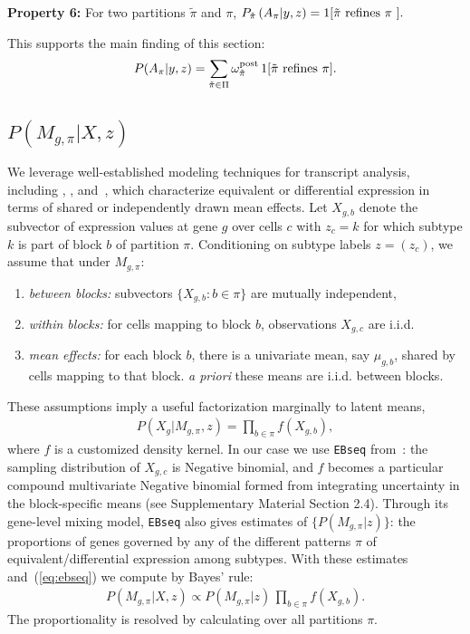 \documentclass[aoas,preprint]{imsart}
\begin{document}
\noindent
{\bf Property 6:} For two partitions $\tilde \pi$ and $\pi$,  
$P_{\tilde \pi}\left( A_{\pi} | y,z \right) = 1[ {\mbox {\rm $\tilde \pi$ refines $\pi$ }}].$

This supports the main finding of this section:
\begin{eqnarray}
\label{eq:mainfinding}
P(A_\pi|y,z) = 
\sum_{\tilde \pi \in \Pi} \omega^{\rm post}_{\tilde \pi} \,  1[ {\mbox {\rm $\tilde \pi$ refines $\pi$}} ].
\end{eqnarray}


\subsection{$P(M_{g,\pi}|X,z)$}
We leverage well-established modeling techniques for transcript analysis, including
\citep{ref:Leng}, \citep{Kendziorski:2003aa}, and~\citep{Jensen:2009aa}, which characterize
 equivalent or differential expression in terms of shared or independently drawn mean effects.  Let
$X_{g,b}$ denote
the subvector of expression values at gene $g$ over cells $c$ with $z_c=k$ for which subtype $k$ is part of
 block $b$ of partition $\pi$.  Conditioning on subtype labels $z=(z_c)$,  we assume that under $M_{g, \pi}$: 
\begin{enumerate}
\item {\em between blocks:} subvectors $\{ X_{g,b}: b \in \pi \}$ are mutually independent,
\item {\em within blocks:} for cells mapping to block $b$, observations $X_{g,c}$ are i.i.d. 
\item {\em mean effects:}  for each block $b$, there is a univariate mean, say $\mu_{g,b}$, 
 shared by cells mapping to that block.  {\em a priori} these means are i.i.d.  between blocks.
\end{enumerate}
These assumptions imply a useful factorization marginally to latent means,
\begin{eqnarray}
\label{eq:ebseq}
P(X_g|M_{g,\pi}, z) = \prod_{b \in \pi} f(X_{g,b}),
\end{eqnarray}
where $f$ is a customized density kernel.  In our case we use \verb+EBseq+ from~\citep{ref:Leng}: 
the sampling distribution of
 $X_{g,c}$ is Negative binomial, and $f$ becomes a particular compound multivariate 
Negative binomial formed from integrating
uncertainty in the block-specific means (see Supplementary Material Section 2.4).  
Through its gene-level mixing model,
\verb+EBseq+ also gives estimates of $\{ P(M_{g,\pi}|z) \}$: the proportions of genes governed by any of the 
different patterns $\pi$ of equivalent/differential expression among subtypes. With these estimates 
and~(\ref{eq:ebseq}) we compute by Bayes' rule:
\begin{eqnarray*}
P(M_{g,\pi}|X,z) \propto P(M_{g,\pi}|z) \, \prod_{b \in \pi} f(X_{g,b}).
\end{eqnarray*}
The proportionality is resolved by calculating over all partitions $\pi$.
\end{document}
